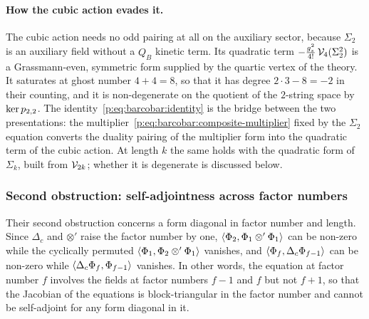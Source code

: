\paragraph{How the cubic action evades it.}
The cubic action needs no odd pairing at all on the auxiliary sector, because $\Sigma_2$ is an auxiliary field without a $Q_B$ kinetic term.
Its quadratic term $- \tfrac{g_s^2}{4!} \, \mathcal{V}_{4}(\Sigma_2^2)$ is a Grassmann-even, symmetric form supplied by the quartic vertex of the theory.
It saturates at ghost number $4 + 4 = 8$, so that it has degree $2 \cdot 3 - 8 = -2$ in their counting, and it is non-degenerate on the quotient of the $2$-string space by $\ker p_{2,2}$.
The identity~\eqref{p:eq:barcobar:identity} is the bridge between the two presentations: the multiplier~\eqref{p:eq:barcobar:composite-multiplier} fixed by the $\Sigma_2$ equation converts the duality pairing of the multiplier form into the quadratic term of the cubic action.
At length $k$ the same holds with the quadratic form of $\Sigma_k$, built from $\mathcal{V}_{2k}$; whether it is degenerate is discussed below.

\subsubsection{Second obstruction: self-adjointness across factor numbers}

Their second obstruction concerns a form diagonal in factor number and length.
Since $\Delta_c$ and $\otimes'$ raise the factor number by one, $\braket{\Phi_2, \Phi_1 \otimes' \Phi_1}_{}$ can be non-zero while the cyclically permuted $\braket{\Phi_1, \Phi_2 \otimes' \Phi_1}_{}$ vanishes, and $\braket{\Phi_f, \Delta_c \Phi_{f-1}}_{}$ can be non-zero while $\braket{\Delta_c \Phi_f, \Phi_{f-1}}_{}$ vanishes.
In other words, the equation at factor number $f$ involves the fields at factor numbers $f - 1$ and $f$ but not $f + 1$, so that the Jacobian of the equations is block-triangular in the factor number and cannot be self-adjoint for any form diagonal in it.

